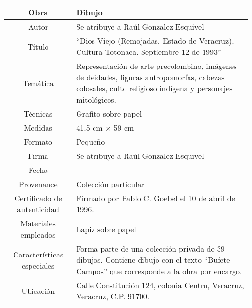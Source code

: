 \documentclass[10pt,letter]{report}
\begin{document}
\begin{table}[H]
\centering
\begin{tabular}{|c|m{}|}
\hline
Obra& Dibujo	\\
\hline
Autor & Se atribuye a Ra\'ul Gonzalez Esquivel\\
\hline
T\'itulo & ``Dios Viejo (Remojadas, Estado de Veracruz). Cultura Totonaca. Septiembre 12 de 1993'' \\
\hline
Tem\'atica & Representaci\'on de arte precolombino, im\'agenes de deidades, figuras antropomorfas, cabezas colosales, culto religioso ind\'igena y personajes mitol\'ogicos.\\
\hline
T\'ecnicas &Grafito sobre papel \\
\hline
Medidas & 41.5 cm $\times$ 59 cm \\
\hline
 Formato & Peque\~no \\
 \hline
 Firma & Se atribuye a Ra\'ul Gonzalez Esquivel \\
 \hline
  Fecha & \\
 \hline
 Provenance & Colecci\'on particular\\
 \hline
 Certificado de autenticidad& Firmado por Pablo C. Goebel el 10 de abril de 1996.  \\
 \hline 
  Materiales empleados & Lapiz sobre papel\\
 \hline
 Caracter\'isticas especiales & Forma parte de una colecci\'on privada de 39 dibujos. 
Contiene dibujo con el texto ``Bufete Campos'' que corresponde a la obra por encargo. \\
\hline 
Ubicaci\'on & Calle Constituci\'on 124, colonia Centro, Veracruz, Veracruz, C.P. 91700.\\
\hline

\end{tabular}
\end{table}
\end{document}
